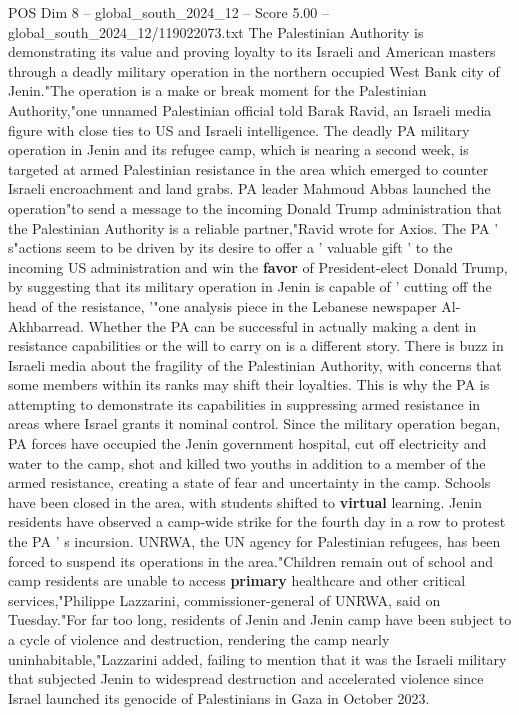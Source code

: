 \begin{textsample}{POS Dim 8 – global\_south\_2024\_12 – Score 5.00 – global\_south\_2024\_12/119022073.txt}  \label{ex:f8_pos_356}
The Palestinian Authority is demonstrating its value and proving loyalty to its Israeli and American masters through a deadly military operation in the northern occupied West Bank city of Jenin."The operation is a make or break moment for the Palestinian Authority,"one unnamed Palestinian official told Barak Ravid, an Israeli media figure with close ties to US and Israeli intelligence.
The deadly PA military operation in Jenin and its refugee camp, which is nearing a second week, is targeted at armed Palestinian resistance in the area which emerged to counter Israeli encroachment and land grabs.
PA leader Mahmoud Abbas launched the operation"to send a message to the incoming Donald Trump administration that the Palestinian Authority is a reliable partner,"Ravid wrote for Axios.
The PA ' s"actions seem to be driven by its desire to offer a ' valuable gift ' to the incoming US administration and win the \textbf{favor} of President-elect Donald Trump, by suggesting that its military operation in Jenin is capable of ' cutting off the head of the resistance, '"one analysis piece in the Lebanese newspaper Al-Akhbarread.
Whether the PA can be successful in actually making a dent in resistance capabilities or the will to carry on is a different story.
There is buzz in Israeli media about the fragility of the Palestinian Authority, with concerns that some members within its ranks may shift their loyalties.
This is why the PA is attempting to demonstrate its capabilities in suppressing armed resistance in areas where Israel grants it nominal control.
Since the military operation began, PA forces have occupied the Jenin government hospital, cut off electricity and water to the camp, shot and killed two youths in addition to a member of the armed resistance, creating a state of fear and uncertainty in the camp.
Schools have been closed in the area, with students shifted to \textbf{virtual} learning.
Jenin residents have observed a camp-wide strike for the fourth day in a row to protest the PA ' s incursion.
UNRWA, the UN agency for Palestinian refugees, has been forced to suspend its operations in the area."Children remain out of school and camp residents are unable to access \textbf{primary} healthcare and other critical services,"Philippe Lazzarini, commissioner-general of UNRWA, said on Tuesday."For far too long, residents of Jenin and Jenin camp have been subject to a cycle of violence and destruction, rendering the camp nearly uninhabitable,"Lazzarini added, failing to mention that it was the Israeli military that subjected Jenin to widespread destruction and accelerated violence since Israel launched its genocide of Palestinians in Gaza in October 2023.

\end{textsample}
